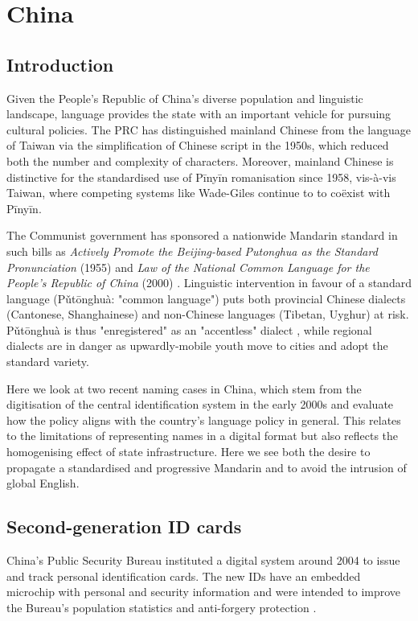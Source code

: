 \section{China}

\subsection{Introduction}

Given the People's Republic of China's diverse population and linguistic
landscape, language provides the state with an important vehicle for pursuing
cultural policies. The PRC has distinguished mainland Chinese from the language
of Taiwan via the simplification of Chinese script in the 1950s, which reduced
both the number and complexity of characters. Moreover, mainland Chinese is
distinctive for the standardised use of Pīnyīn romanisation since 1958,
vis-à-vis Taiwan, where competing systems like Wade-Giles continue to to
coëxist with Pīnyīn. 

The Communist government has sponsored a nationwide Mandarin standard in such
bills as \textit{Actively Promote the Beijing-based Putonghua as the Standard
Pronunciation} (1955) and \textit{Law of the National Common Language for the
People’s Republic of China} (2000) \parencite{dong10}. Linguistic intervention
in favour of a standard language (Pǔtōnghuà: "common language") puts both
provincial Chinese dialects (Cantonese, Shanghainese) and non-Chinese languages
(Tibetan, Uyghur) at risk. Pǔtōnghuà is thus "enregistered" as an "accentless"
dialect \parencite{dong10}, while regional dialects are in danger as
upwardly-mobile youth move to cities and adopt the standard variety.

Here we look at two recent naming cases in China, which stem from the
digitisation of the central identification system in the early 2000s and
evaluate how the policy aligns with the country's language policy in general.
This relates to the limitations of representing names in a digital format but
also reflects the homogenising effect of state infrastructure. Here we see both
the desire to propagate a standardised and progressive Mandarin and to avoid
the intrusion of global English.

\subsection{Second-generation ID cards}

China's Public Security Bureau instituted a digital system around 2004 to issue
and track personal identification cards. The new IDs have an embedded microchip
with personal and security information and were intended to improve the
Bureau's population statistics and anti-forgery protection \parencite{ciicn04}.

